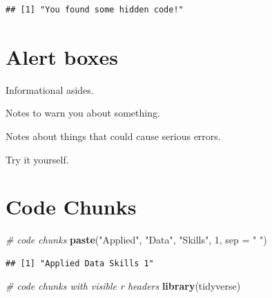 \documentclass[
  oneside]{book}
\newenvironment{Shaded}{\begin{snugshade}}{\end{snugshade}}
\newcommand{\AttributeTok}[1]{\textcolor[rgb]{0.13,0.29,0.53}{#1}}
\newcommand{\CommentTok}[1]{\textcolor[rgb]{0.56,0.35,0.01}{\textit{#1}}}
\newcommand{\DecValTok}[1]{\textcolor[rgb]{0.00,0.00,0.81}{#1}}
\newcommand{\FunctionTok}[1]{\textcolor[rgb]{0.13,0.29,0.53}{\textbf{#1}}}
\newcommand{\NormalTok}[1]{#1}
\newcommand{\StringTok}[1]{\textcolor[rgb]{0.31,0.60,0.02}{#1}}
\begin{document}
\begin{verbatim}
## [1] "You found some hidden code!"
\end{verbatim}

\hypertarget{alert-boxes}{%
\section{Alert boxes}\label{alert-boxes}}

\begin{info}
Informational asides.

\end{info}

\begin{warning}
Notes to warn you about something.

\end{warning}

\begin{dangerous}
Notes about things that could cause serious errors.

\end{dangerous}

\begin{try}
Try it yourself.

\end{try}

\hypertarget{code-chunks}{%
\section{Code Chunks}\label{code-chunks}}

\begin{Shaded}
\begin{Highlighting}[]
\CommentTok{\# code chunks}
\FunctionTok{paste}\NormalTok{(}\StringTok{"Applied"}\NormalTok{, }\StringTok{"Data"}\NormalTok{, }\StringTok{"Skills"}\NormalTok{, }\DecValTok{1}\NormalTok{, }\AttributeTok{sep =} \StringTok{" "}\NormalTok{)}
\end{Highlighting}
\end{Shaded}

\begin{verbatim}
## [1] "Applied Data Skills 1"
\end{verbatim}

\begin{Shaded}
\begin{Highlighting}[]
\CommentTok{\# code chunks with visible r headers}
\FunctionTok{library}\NormalTok{(tidyverse)}
\end{Highlighting}
\end{Shaded}
\end{document}
